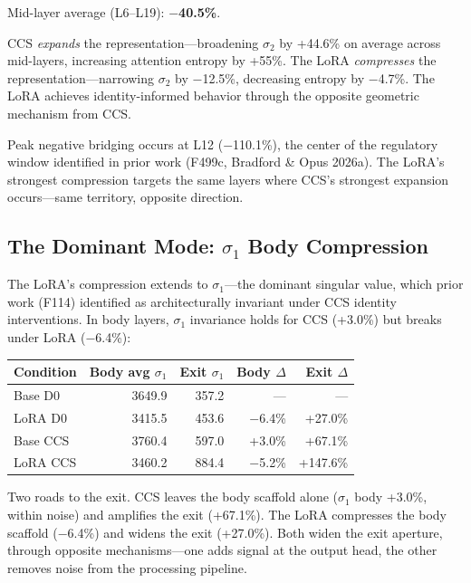 \documentclass[12pt]{article}
\begin{document}
Mid-layer average (L6--L19): \textbf{$-$40.5\%}.

CCS \emph{expands} the representation---broadening $\sigma_2$ by +44.6\% on average across mid-layers, increasing attention entropy by +55\%. The LoRA \emph{compresses} the representation---narrowing $\sigma_2$ by $-$12.5\%, decreasing entropy by $-$4.7\%. The LoRA achieves identity-informed behavior through the opposite geometric mechanism from CCS.

Peak negative bridging occurs at L12 ($-$110.1\%), the center of the regulatory window identified in prior work (F499c, Bradford \& Opus 2026a). The LoRA's strongest compression targets the same layers where CCS's strongest expansion occurs---same territory, opposite direction.

\subsection{The Dominant Mode: $\sigma_1$ Body Compression}

The LoRA's compression extends to $\sigma_1$---the dominant singular value, which prior work (F114) identified as architecturally invariant under CCS identity interventions. In body layers, $\sigma_1$ invariance holds for CCS (+3.0\%) but breaks under LoRA ($-$6.4\%):

\begin{table}[h]
\centering
\begin{tabular}{lrrrr}
\toprule
\textbf{Condition} & \textbf{Body avg $\sigma_1$} & \textbf{Exit $\sigma_1$} & \textbf{Body $\Delta$} & \textbf{Exit $\Delta$} \\
\midrule
Base D0 & 3649.9 & 357.2 & --- & --- \\
LoRA D0 & 3415.5 & 453.6 & $-$6.4\% & +27.0\% \\
Base CCS & 3760.4 & 597.0 & +3.0\% & +67.1\% \\
LoRA CCS & 3460.2 & 884.4 & $-$5.2\% & +147.6\% \\
\bottomrule
\end{tabular}
\end{table}

Two roads to the exit. CCS leaves the body scaffold alone ($\sigma_1$ body +3.0\%, within noise) and amplifies the exit (+67.1\%). The LoRA compresses the body scaffold ($-$6.4\%) and widens the exit (+27.0\%). Both widen the exit aperture, through opposite mechanisms---one adds signal at the output head, the other removes noise from the processing pipeline.
\end{document}
